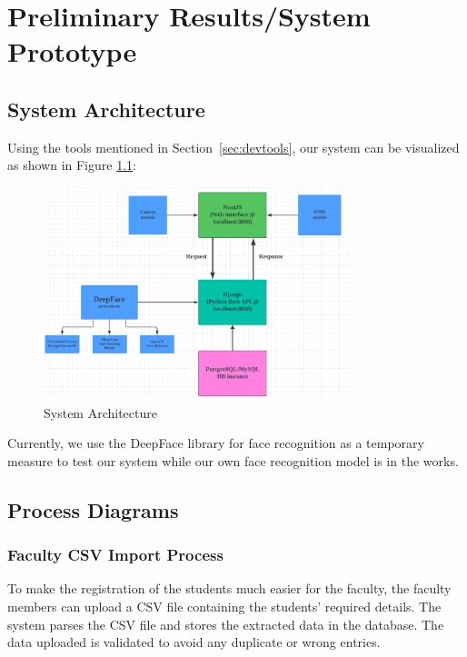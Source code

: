 \chapter{Preliminary Results/System Prototype}

\section{System Architecture}
Using the tools mentioned in Section~\ref{sec:devtools}, our system can be visualized as shown in Figure \ref{fig:architecture}: 
\begin{figure}[h] %
	\centering
	\includegraphics[width=0.8\textwidth]{figures/chapter4/architecture.png} %
	\caption{System Architecture}
	\label{fig:architecture}
\end{figure}

Currently, we use the DeepFace library for face recognition as a temporary measure to test our system while our own face recognition model is in the works.
\section{Process Diagrams}

\subsection{Faculty CSV Import Process}
	To make the registration of the students much easier for the faculty, the faculty members can upload a CSV file containing the students' required details. The system parses the CSV file and stores the extracted data in the database. The data uploaded is validated to avoid any duplicate or wrong entries.

